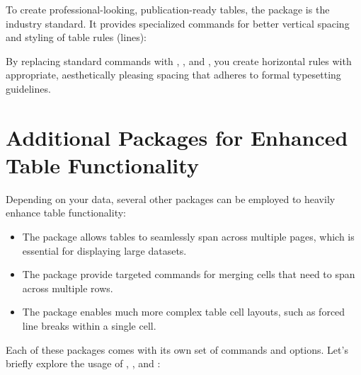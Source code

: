		To create professional-looking, publication-ready tables, the  package is the industry standard. 
		It provides specialized commands for better vertical spacing and styling of table rules (lines):


		By replacing standard  commands with , , and , you create horizontal rules with appropriate, aesthetically pleasing spacing that adheres to formal typesetting guidelines.

	\section{Additional Packages for Enhanced Table Functionality}

		Depending on your data, several other packages can be employed to heavily enhance table functionality:

		\begin{itemize}
		    \item The  package allows tables to seamlessly span across multiple pages, which is essential for displaying large datasets.
		    \item The  package provide targeted commands for merging cells that need to span across multiple rows.
		    \item The  package enables much more complex table cell layouts, such as forced line breaks within a single cell.
		\end{itemize}
		Each of these packages comes with its own set of commands and options. 
		Let's briefly explore the usage of , , and :

